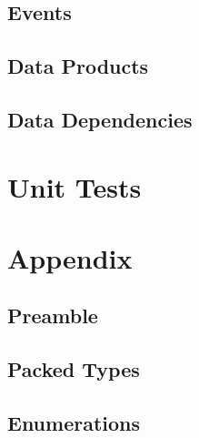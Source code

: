 

\subsection{Events}



\subsection{Data Products}



\subsection{Data Dependencies}



\section{Unit Tests}



\section{Appendix}

\subsection{Preamble}



\subsection{Packed Types}



\subsection{Enumerations}




